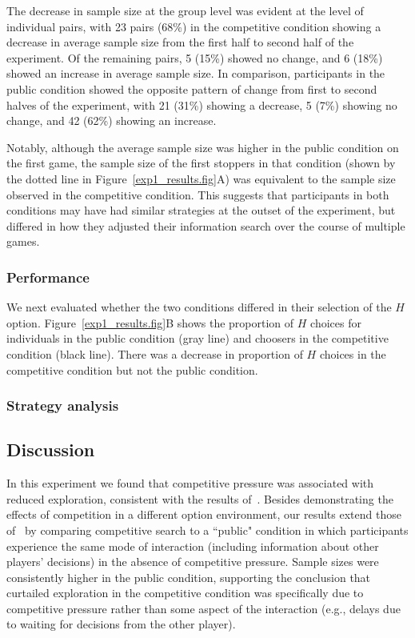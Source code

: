 \documentclass[11pt,jou]{apa6}
\begin{document}
The decrease in sample size at the group level was evident at the level of individual pairs, with 23 pairs (68\%) in the competitive condition showing a decrease in average sample size from the first half to second half of the experiment. Of the remaining pairs, 5 (15\%) showed no change, and 6 (18\%) showed an increase in average sample size.
In comparison, participants in the public condition showed the opposite pattern of change from first to second halves of the experiment, with 21 (31\%) showing a decrease, 5 (7\%) showing no change, and 42 (62\%) showing an increase.

Notably, although the average sample size was higher in the public condition on the first game, the sample size of the first stoppers in that condition (shown by the dotted line in Figure~\ref{exp1_results.fig}A) was equivalent to the sample size observed in the competitive condition.
This suggests that participants in both conditions may have had similar strategies at the outset of the experiment, but differed in how they adjusted their information search over the course of multiple games.




\subsubsection{Performance}

We next evaluated whether the two conditions differed in their selection of the $H$ option.
Figure~\ref{exp1_results.fig}B shows the proportion of $H$ choices for individuals in the public condition (gray line) and choosers in the competitive condition (black line).
There was a decrease in proportion of $H$ choices in the competitive condition but not the public condition.

\subsubsection{Strategy analysis}


\subsection{Discussion}

In this experiment we found that competitive pressure was associated with reduced exploration, consistent with the results of~.
Besides demonstrating the effects of competition in a different option environment, our results extend those of~ by comparing competitive search to a ``public" condition in which participants experience the same mode of interaction (including information about other players' decisions) in the absence of competitive pressure.
Sample sizes were consistently higher in the public condition, supporting the conclusion that curtailed exploration in the competitive condition was specifically due to competitive pressure rather than some aspect of the interaction (e.g., delays due to waiting for decisions from the other player).
\end{document}
